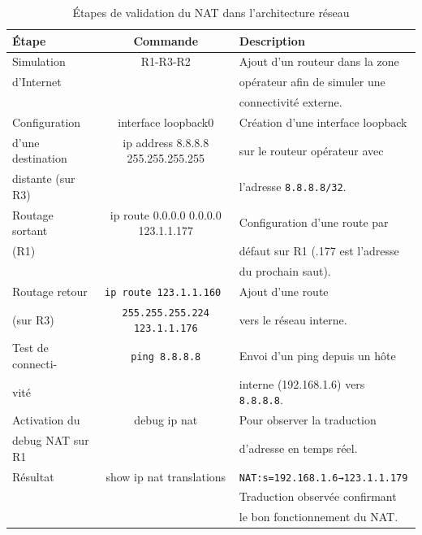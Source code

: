 \documentclass[12pt,a4paper, oneside]{memoir}
\begin{document}
\begin{table}[H]
	\centering
	\renewcommand{\arraystretch}{1.3}
	\begin{tabular}{|p{3.5cm}|c|l|}
		\hline
		\textbf{Étape} & Commande & \textbf{Description} \\
		\hline
		Simulation & R1-R3-R2 & Ajout d’un routeur dans la zone \\
		 d’Internet & & opérateur afin de simuler une \\
		  & & connectivité externe. \\
		\hline
		
		Configuration  & interface loopback0 & Création d’une interface loopback\\
		d’une destination & ip address 8.8.8.8 255.255.255.255 & sur le routeur opérateur avec \\
		distante (sur R3)&  & l’adresse \texttt{8.8.8.8/32}.\\
		\hline
		
		Routage sortant & ip route 0.0.0.0 0.0.0.0 123.1.1.177 & Configuration d’une route par  \\
		(R1) & & défaut sur R1 (.177 est l'adresse\\
		& &  du prochain saut).\\
		\hline
		
		Routage retour& \texttt{ip route 123.1.1.160 } & Ajout d’une route  \\
		 (sur R3) & \texttt{255.255.255.224 123.1.1.176} & vers le réseau interne. \\
		\hline
		Test de connecti- & \texttt{ping 8.8.8.8} & Envoi d’un ping depuis un hôte \\
		 vité& &  interne (192.168.1.6) vers \texttt{8.8.8.8}. \\
		\hline
		
		Activation du  & debug ip nat & Pour observer la traduction \\
		 debug NAT sur R1 & &  d’adresse en temps réel. \\
		\hline
		
		Résultat & show ip nat translations & \texttt{NAT:s=192.168.1.6→123.1.1.179} \\
		& & Traduction observée confirmant \\
		 & & le bon fonctionnement du NAT. \\
		\hline
		
	\end{tabular}
	\caption{Étapes de validation du NAT dans l’architecture réseau}
	\label{tab:validation_nat}
\end{table}
	
\end{document}
